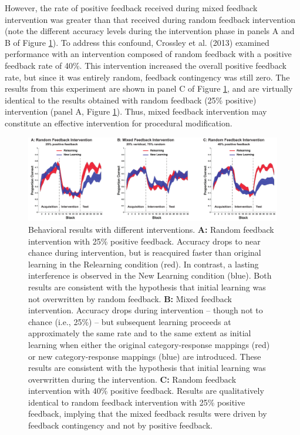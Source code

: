 However, the rate of positive feedback received during mixed feedback
intervention was greater than that received during random feedback intervention
(note the different accuracy levels during the intervention phase in panels A
and B of Figure \ref{fig:unlearning_data}). To address this confound, Crossley
et al. (2013) examined performance with an intervention composed of random
feedback with a positive feedback rate of 40\%. This intervention increased the
overall positive feedback rate, but since it was entirely random, feedback
contingency was still zero. The results from this experiment are shown in panel
C of Figure \ref{fig:unlearning_data}, and are virtually identical to the
results obtained with random feedback (25\% positive) intervention (panel A,
Figure \ref{fig:unlearning_data}). Thus, mixed feedback intervention may
constitute an effective intervention for procedural modification.

\begin{figure}[h]
  \centering \includegraphics[width=1.0\textwidth]{../figures/fig_unlearning_results.pdf}
  \caption{
    Behavioral results with different interventions. \textbf{A:} Random
    feedback intervention with 25\% positive feedback. Accuracy drops to near chance
    during intervention, but is reacquired faster than original learning in the
    Relearning condition (red). In contrast, a lasting interference is observed in
    the New Learning condition (blue). Both results are consistent with the
    hypothesis that initial learning was not overwritten by random feedback.
    \textbf{B:} Mixed feedback intervention. Accuracy drops during intervention --
    though not to chance (i.e., 25\%) -- but subsequent learning proceeds at
    approximately the same rate and to the same extent as initial learning when
    either the original category-response mappings (red) or new category-response
    mappings (blue) are introduced. These results are consistent with the hypothesis
    that initial learning was overwritten during the intervention. \textbf{C:}
    Random feedback intervention with 40\% positive feedback. Results are
    qualitatively identical to random feedback intervention with 25\% positive
    feedback, implying that the mixed feedback results were driven by feedback
    contingency and not by positive feedback. }
  \label{fig:unlearning_data}
\end{figure}


